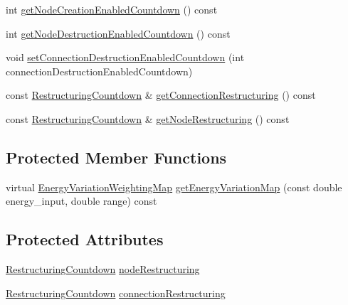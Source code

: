 \begin{DoxyCompactItemize}
int \hyperlink{classcryomesh_1_1manipulators_1_1ClusterAnalyserBasic_a9a5351e606da405ecadd9c1fc2b02088}{get\-Node\-Creation\-Enabled\-Countdown} () const 
\item 
int \hyperlink{classcryomesh_1_1manipulators_1_1ClusterAnalyserBasic_a313a72ad507f7bf3c614306c46d872aa}{get\-Node\-Destruction\-Enabled\-Countdown} () const 
\item 
void \hyperlink{classcryomesh_1_1manipulators_1_1ClusterAnalyserBasic_ac816c1b7e855dca5f96dcaa56d6b456c}{set\-Connection\-Destruction\-Enabled\-Countdown} (int connection\-Destruction\-Enabled\-Countdown)
\item 
const \hyperlink{structcryomesh_1_1manipulators_1_1IClusterAnalyser_1_1RestructuringCountdown}{\-Restructuring\-Countdown} \& \hyperlink{classcryomesh_1_1manipulators_1_1IClusterAnalyser_af8eb711949e1d69bbe31b564ff9ab340}{get\-Connection\-Restructuring} () const 
\item 
const \hyperlink{structcryomesh_1_1manipulators_1_1IClusterAnalyser_1_1RestructuringCountdown}{\-Restructuring\-Countdown} \& \hyperlink{classcryomesh_1_1manipulators_1_1IClusterAnalyser_a72da7d8f63441671b8ebd1f4cd994347}{get\-Node\-Restructuring} () const 
\end{DoxyCompactItemize}
\subsection*{\-Protected \-Member \-Functions}
\begin{DoxyCompactItemize}
\item 
virtual \hyperlink{structcryomesh_1_1manipulators_1_1IClusterAnalyser_1_1EnergyVariationWeightingMap}{\-Energy\-Variation\-Weighting\-Map} \hyperlink{classcryomesh_1_1manipulators_1_1ClusterAnalyserBasic_a8870233415221b9c971a30452fb9452a}{get\-Energy\-Variation\-Map} (const double energy\-\_\-input, double range) const 
\end{DoxyCompactItemize}
\subsection*{\-Protected \-Attributes}
\begin{DoxyCompactItemize}
\item 
\hyperlink{structcryomesh_1_1manipulators_1_1IClusterAnalyser_1_1RestructuringCountdown}{\-Restructuring\-Countdown} \hyperlink{classcryomesh_1_1manipulators_1_1IClusterAnalyser_a78d90b9829e4188ded3d94da49c6887a}{node\-Restructuring}
\item 
\hyperlink{structcryomesh_1_1manipulators_1_1IClusterAnalyser_1_1RestructuringCountdown}{\-Restructuring\-Countdown} \hyperlink{classcryomesh_1_1manipulators_1_1IClusterAnalyser_ae0442c245ec17e22d51ffd05c3a2f86e}{connection\-Restructuring}
\end{DoxyCompactItemize}

